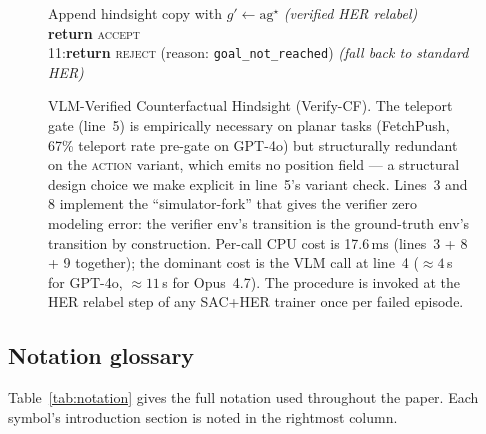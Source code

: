 \begin{figure}[t]
{{\quad\quad\;Append hindsight copy with $g'\!\leftarrow\!\text{ag}^\star$ \hfill\textit{(verified HER relabel)}\\
\quad\quad\;\textbf{return} \textsc{accept}\\
\quad\textsc{11:}\;\textbf{return} \textsc{reject} (reason: \texttt{goal\_not\_reached}) \hfill\textit{(fall back to standard HER)}
}}
\caption{VLM-Verified Counterfactual Hindsight (Verify-CF). The
teleport gate (line~5) is empirically necessary on planar tasks
(FetchPush, 67\% teleport rate pre-gate on GPT-4o)
but structurally redundant on the \textsc{action} variant, which emits
no position field --- a structural design choice we make explicit in
line~5's variant check. Lines~3 and 8 implement the
``simulator-fork'' that gives the verifier zero modeling error: the
verifier env's transition is the ground-truth env's transition by
construction. Per-call CPU cost is 17.6\,ms (lines~3 + 8 + 9
together); the dominant cost is the VLM call at line~4
($\approx\!4$\,s for GPT-4o, $\approx\!11$\,s for Opus~4.7). The
procedure is invoked at the HER relabel step of any SAC+HER trainer
once per failed episode.}
\label{alg:verified-cf}
\end{figure}

\subsection{Notation glossary}
\label{app:notation}

Table~\ref{tab:notation} gives the full notation used throughout the
paper. Each symbol's introduction section is noted in the rightmost
column.


